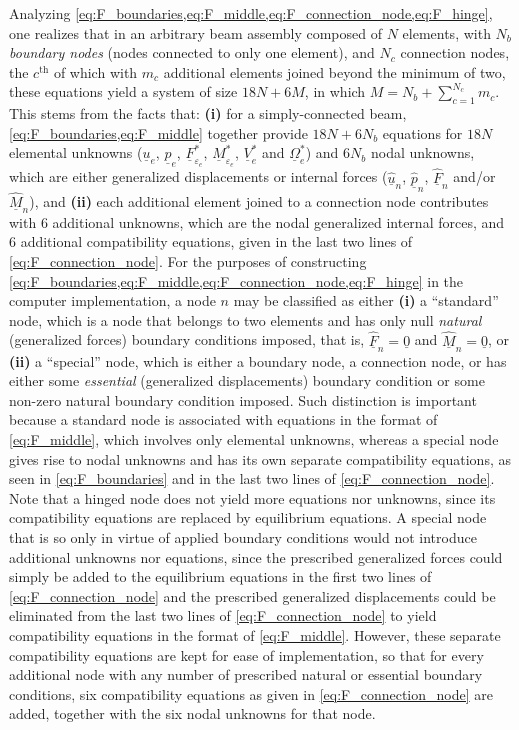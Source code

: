 \documentclass[12pt,a4paper,oneside,english]{abntex2} %
\newcommand{\fix}[1]{{\color{red}#1}}
\newcommand{\vect}[1]{\underline{#1}}
\def\u{\vect{u}}
\def\uhat{\widehat{\u}}
\def\V{\vect{V}}
\def\Vs{\V^{*}}
\def\Om{\vect{\Omega}}
\def\Oms{\Om^{*}}
\def\p{\vect{p}}
\def\phat{\widehat{\p}}
\def\F{\vect{F}}
\def\Fhat{\widehat{\F}}
\def\M{\vect{M}}
\def\Mhat{\widehat{\M}}
\def\zv{\vect{0}}
\def\ue{\u_e}
\def\pe{\p_e}
\def\Vse{\Vs_e}
\def\Omse{\Oms_e}
\def\Fsepse{\F^*_{\varepsilon_e}}
\def\Msepse{\M^*_{\varepsilon_e}}
\begin{document}
Analyzing \cref{eq:F_boundaries,eq:F_middle,eq:F_connection_node,eq:F_hinge}, one realizes that in an arbitrary beam assembly composed of $N$ elements, with $N_b$ \textit{boundary nodes} (nodes connected to only one element), and $N_c$ connection nodes, the $c^{\text{th}}$ of which with $m_c$ additional elements joined beyond the minimum of two, these equations yield a system of size $18N+6M$, in which $M = N_b+\sum_{c=1}^{N_c}m_c$. This stems from the facts that: \textbf{(i)} for a simply-connected beam, \cref{eq:F_boundaries,eq:F_middle} together provide $18N+6N_b$ equations for $18N$ elemental unknowns ($\ue$, $\pe$, \fix{$\Fsepse$, $\Msepse$}, $\Vse$ and $\Omse$) and $6N_b$ nodal unknowns, which are either generalized displacements or internal forces ($\uhat_n$, $\phat_n$, $\Fhat_n$ and/or $\Mhat_n$), and \textbf{(ii)} each additional element joined to a connection node contributes with 6 additional unknowns, which are the nodal generalized internal forces, and 6 additional compatibility equations, given in the last two lines of \cref{eq:F_connection_node}. For the purposes of constructing \cref{eq:F_boundaries,eq:F_middle,eq:F_connection_node,eq:F_hinge} in the computer implementation, a node $n$ may be classified as either \textbf{(i)} a ``standard'' node, which is a node that belongs to two elements and has only null \textit{natural} (generalized forces) boundary conditions imposed, that is, $\Fhat_n = \zv$ and $\Mhat_n = \zv$, or \textbf{(ii)} a ``special'' node, which is either a boundary node, a connection node, or has either some \textit{essential} (generalized displacements) boundary condition or some non-zero natural boundary condition imposed. Such distinction is important because a standard node is associated with equations in the format of \cref{eq:F_middle}, which involves only elemental unknowns, whereas a special node gives rise to nodal unknowns and has its own separate compatibility equations, as seen in \cref{eq:F_boundaries} and in the last two lines of \cref{eq:F_connection_node}. Note that a hinged node does not yield more equations nor unknowns, since its compatibility equations are replaced by equilibrium equations. A special node that is so only in virtue of applied boundary conditions would not introduce additional unknowns nor equations, since the prescribed generalized forces could simply be added to the equilibrium equations in the first two lines of \cref{eq:F_connection_node} and the prescribed generalized displacements could be eliminated from the last two lines of \cref{eq:F_connection_node} to yield compatibility equations in the format of \cref{eq:F_middle}. However, these separate compatibility equations are kept for ease of implementation, so that for every additional node with any number of prescribed natural or essential boundary conditions, six compatibility equations as given in \cref{eq:F_connection_node} are added, together with the six nodal unknowns for that node. 
\end{document}
